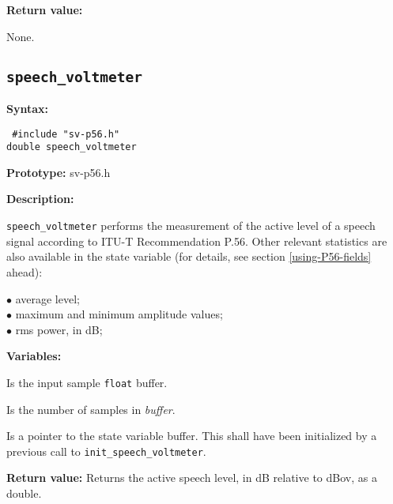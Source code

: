 {\bf Return value: }      
               
None.


\subsection{{\tt speech\_voltmeter}}

{\bf Syntax: } 

{\tt
\#include "sv-p56.h"\\
double speech\_voltmeter
}

{\bf Prototype: }       sv-p56.h

{\bf Description: }

{\tt speech\_voltmeter} performs the measurement of the active level of
a speech signal according to ITU-T Recommendation P.56. Other relevant
statistics are also available in the state variable (for details, see
section \ref{using-P56-fields} ahead):

\begin{minipage}{130mm}
 $\bullet$ average level;\\
 $\bullet$ maximum and minimum amplitude values;\\
 $\bullet$ rms power, in dB;\\
\end{minipage}


{\bf Variables: }
\begin{Descr}{\DescrLen}
\item[\pbox{20mm}{\em buffer}] %
               Is the input sample {\tt float} buffer.

\item[\pbox{20mm}{\em smpno}] %
               Is the number of samples in {\em buffer}.

\item[\pbox{20mm}{\em state}] %
               Is a pointer to the state variable buffer. This 
               shall have been initialized by a previous call to 
               {\tt init\_speech\_voltmeter}.
\end{Descr}
        
{\bf Return value: }      
    Returns the active speech level, in dB relative to dBov, as a double.


